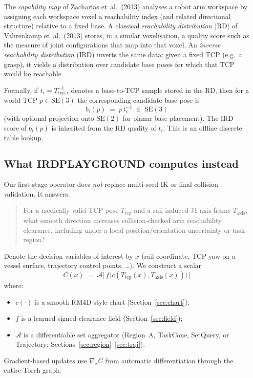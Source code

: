 \documentclass[11pt,a4paper]{article}
\newcommand{\SE}{\mathrm{SE}}
\newcommand{\Tcp}{T_{\mathrm{tcp}}}
\newcommand{\Taxis}{T_{\mathrm{axis}}}
\begin{document}
The \emph{capability map} of Zacharias et~al.\ (2013) analyses a robot arm
workspace by assigning each workspace voxel a reachability index (and related
directional structure) relative to a fixed base.
A classical \emph{reachability distribution} (RD) of Vahrenkamp et~al.\
(2013) stores, in a similar voxelisation, a quality score such as the measure
of joint configurations that map into that voxel.
An \emph{inverse reachability distribution} (IRD) inverts the same data:
given a fixed TCP (e.g.\ a grasp), it yields a distribution over candidate
base poses for which that TCP would be reachable.

Formally, if \(t_{i}=T_{\mathrm{tcp},i}^{-1}\) denotes a base-to-TCP sample stored in the
RD, then for a world TCP \(p\in\SE(3)\) the corresponding candidate base pose
is
\begin{equation}
\label{eq:ird-inversion}
  b_{i}(p) \;=\; p\, t_{i}^{-1}
  \;\in\;\SE(3)
\end{equation}
(with optional projection onto \(\SE(2)\) for planar base placement).
The IRD score of \(b_{i}(p)\) is inherited from the RD quality of \(t_{i}\).
This is an offline discrete table lookup.

\subsection{What IRDPLAYGROUND computes instead}
\label{sec:our-question}

Our first-stage operator does \emph{not} replace multi-seed IK or final
collision validation. It answers:

\begin{quote}
For a medically valid TCP pose \(\Tcp\) and a rail-induced J1-axis frame
\(\Taxis\), what smooth direction increases collision-checked arm
reachability clearance, including under a local position/orientation
uncertainty or task region?
\end{quote}

Denote the decision variables of interest by \(x\) (rail coordinate, TCP yaw
on a vessel surface, trajectory control points, \ldots). We construct a scalar
\begin{equation}
\label{eq:operator-goal}
  C(x)
  \;=\;
  \mathcal{A}\bigl[\, f\bigl(c(\Tcp(x),\Taxis(x))\bigr)\,\bigr]
\end{equation}
where:
\begin{itemize}[leftmargin=1.4em]
  \item \(c(\cdot)\) is a smooth RM4D-style chart (Section~\ref{sec:chart});
  \item \(f\) is a learned signed clearance field (Section~\ref{sec:field});
  \item \(\mathcal{A}\) is a differentiable set aggregator
        (Region~A, TaskCone, SetQuery, or Trajectory;
        Sections~\ref{sec:region}--\ref{sec:traj}).
\end{itemize}
Gradient-based updates use \(\nabla_{x} C\) from automatic differentiation
through the entire Torch graph.
\end{document}
